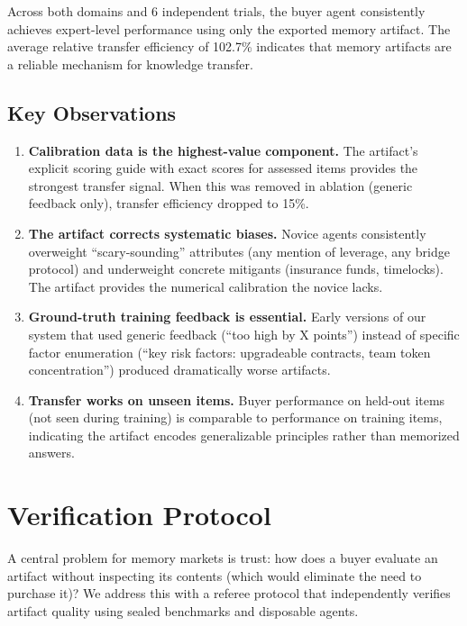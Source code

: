 \documentclass[11pt]{article}
\begin{document}
Across both domains and 6 independent trials, the buyer agent consistently achieves expert-level performance using only the exported memory artifact. The average relative transfer efficiency of 102.7\% indicates that memory artifacts are a reliable mechanism for knowledge transfer.

\subsection{Key Observations}

\begin{enumerate}[leftmargin=2em]
  \item \textbf{Calibration data is the highest-value component.} The artifact's explicit scoring guide with exact scores for assessed items provides the strongest transfer signal. When this was removed in ablation (generic feedback only), transfer efficiency dropped to 15\%.

  \item \textbf{The artifact corrects systematic biases.} Novice agents consistently overweight ``scary-sounding'' attributes (any mention of leverage, any bridge protocol) and underweight concrete mitigants (insurance funds, timelocks). The artifact provides the numerical calibration the novice lacks.

  \item \textbf{Ground-truth training feedback is essential.} Early versions of our system that used generic feedback (``too high by X points'') instead of specific factor enumeration (``key risk factors: upgradeable contracts, team token concentration'') produced dramatically worse artifacts.

  \item \textbf{Transfer works on unseen items.} Buyer performance on held-out items (not seen during training) is comparable to performance on training items, indicating the artifact encodes generalizable principles rather than memorized answers.
\end{enumerate}

\section{Verification Protocol}
\label{sec:verification}

A central problem for memory markets is trust: how does a buyer evaluate an artifact without inspecting its contents (which would eliminate the need to purchase it)? We address this with a referee protocol that independently verifies artifact quality using sealed benchmarks and disposable agents.
\end{document}
